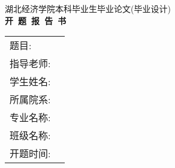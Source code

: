 \pagestyle{empty}
\newcommand{\ul}{\underline}
\newcommand{\ulbox}[1]{\ul{\makebox[10cm]{#1}}}

\begin{center}
	{\xiaoer\heiti 湖北经济学院本科毕业生毕业论文\-(毕业设计)} \\[1cm]
	{\chuhao\bfseries 开~题~报~告~书} \\[5cm]

	\sanhao
	\begin{tabular}{lc} 
		题\qquad 目:& \ulbox{\kaiti\stitle}  \\ 
		指导老师:& \ulbox{\kaiti\smentorn\-(\smentort)} \\
		学生姓名:& \ulbox{\kaiti\sauthor} \\
		所属院系:& \ulbox{\kaiti\sinfos} \\
		专业名称:& \ulbox{\kaiti\sinfop} \\
		班级名称:& \ulbox{\kaiti\sinfoc} \\
		开题时间:& \ulbox{\kaiti\sreporttime} \\	
	\end{tabular}
\end{center}

\newpage

